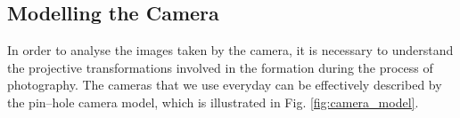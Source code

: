 \documentclass[11pt,twoside]{report}
\begin{document}
 
%
% 
%
% 
% 
% 
% 



\subsection{Modelling the Camera}


In order to analyse the images taken by the camera, it is necessary to understand the projective transformations involved in the formation during the process of photography. The cameras that we use everyday can be effectively described by the pin--hole camera model, which is illustrated in Fig. \ref{fig:camera_model}.
\end{document}
